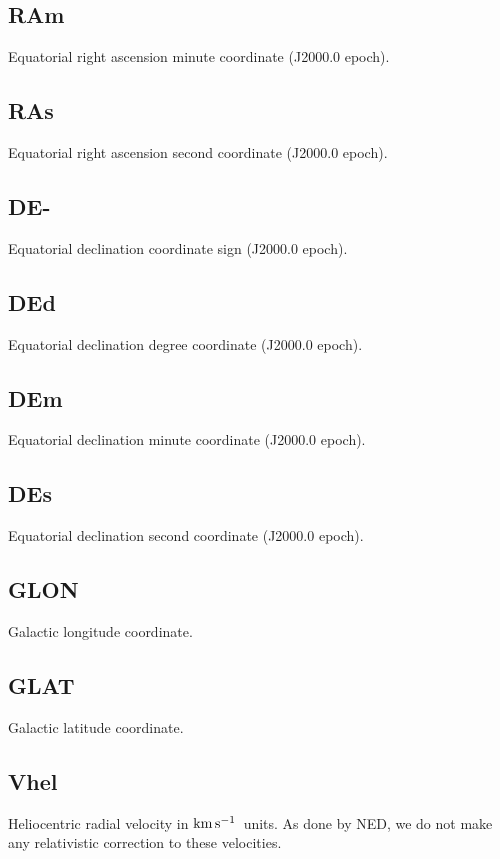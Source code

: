 \documentclass[twocolumn,tighten]{aastex62}
\newcommand{\kms}{$\rm km\, s^{-1}$}
\begin{document}
\subsection{RAm} \label{RAm}
Equatorial right ascension minute coordinate (J2000.0 epoch).

\subsection{RAs} \label{RAs}
Equatorial right ascension second coordinate (J2000.0 epoch).

\subsection{DE-} \label{DE-}
Equatorial declination coordinate sign (J2000.0 epoch).

\subsection{DEd} \label{DEd}
Equatorial declination degree coordinate (J2000.0 epoch).

\subsection{DEm} \label{DEm}
Equatorial declination minute coordinate (J2000.0 epoch).

\subsection{DEs} \label{DEs}
Equatorial declination second coordinate (J2000.0 epoch).

\subsection{GLON} \label{GLON}
Galactic longitude coordinate.

\subsection{GLAT} \label{GLAT}
Galactic latitude coordinate.

\subsection{Vhel} \label{Vhel}
Heliocentric radial velocity in \kms~units. As done by NED, we do not make any relativistic correction to these velocities.
\end{document}

